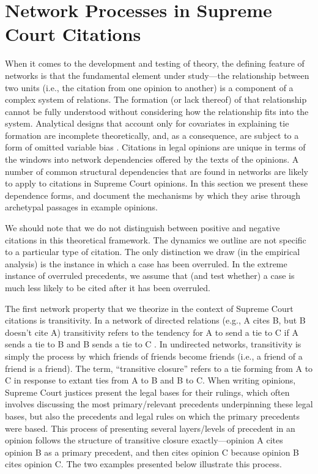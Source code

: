 \documentclass[headsepline=true, abstracton]{scrartcl}
\begin{document}
\section{Network Processes in Supreme Court Citations}

When it comes to the development and testing of theory, the defining feature of networks is that the fundamental element under study---the relationship between two units (i.e., the citation from one opinion to another) is a component of a complex system of relations. The formation (or lack thereof) of that relationship cannot be fully understood without considering how the relationship fits into the system. Analytical designs that account only for covariates in explaining tie formation are incomplete theoretically, and, as a consequence, are subject to a form of omitted variable bias \citep{cranmer2016critique}. Citations in legal opinions are unique in terms of the windows into network dependencies offered by the texts of the opinions. A number of common structural dependencies that are found in networks are likely to apply to citations in Supreme Court opinions. In this section we present these dependence forms, and document the mechanisms by which they arise through archetypal passages in example opinions. 

We should note that we do not distinguish between positive and negative citations in this theoretical framework. The dynamics we outline are not specific to a particular type of citation. The only distinction we draw (in the empirical analysis) is the instance in which a case has been overruled. In the extreme instance of overruled precedents, we assume that (and test whether) a case is much less likely to be cited after it has been overruled.

The first network property that we theorize in the context of Supreme Court citations is transitivity. In a network of directed relations (e.g., A cites B, but B doesn't cite A) transitivity refers to the tendency for A to send a tie to C if A sends a tie to B and B sends a tie to C \citep{holland1971transitivity}. In undirected networks, transitivity is simply the process by which friends of friends become friends (i.e., a friend of a friend is a friend). The term, ``transitive closure'' refers to a tie forming from A to C in response to extant ties from A to B and B to C. When writing opinions, Supreme Court justices present the legal bases for their rulings, which often involves discussing the most primary/relevant precedents underpinning these legal bases, but also the precedents and legal rules on which the primary precedents were based. This process of presenting several layers/levels of precedent in an opinion follows the structure of transitive closure exactly---opinion A cites opinion B as a primary precedent, and then cites opinion C because opinion B cites opinion C. The two examples presented below illustrate this process.
\end{document}
